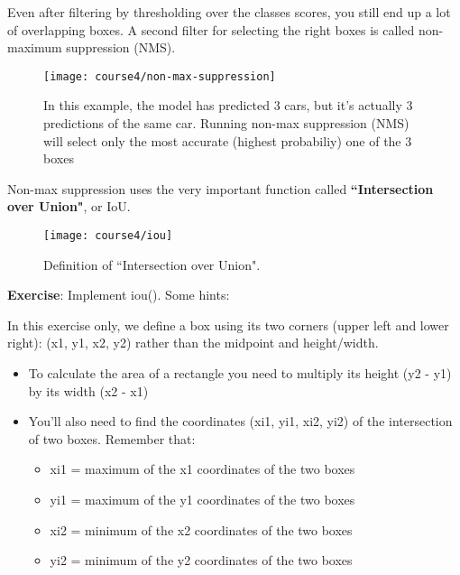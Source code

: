 Even after filtering by thresholding over the classes scores, you still end up a lot of overlapping boxes. A second filter for selecting the right boxes is called non-maximum suppression (NMS).
\begin{figure}[h]
\begin{center}
\texttt{[image: course4/non-max-suppression]}
\caption{In this example, the model has predicted 3 cars, but it's actually 3 predictions of the same car. Running non-max suppression (NMS) will select only the most accurate (highest probabiliy) one of the 3 boxes}
\end{center}
\end{figure}

Non-max suppression uses the very important function called {\textbf {``Intersection over Union"}}, or IoU.
\begin{figure}[h]
\begin{center}
\texttt{[image: course4/iou]}
\caption{Definition of ``Intersection over Union". }
\end{center}
\end{figure}




{\textbf {Exercise}}: Implement iou(). Some hints:

In this exercise only, we define a box using its two corners (upper left and lower right): (x1, y1, x2, y2) rather than the midpoint and height/width.
\begin{itemize}
\item To calculate the area of a rectangle you need to multiply its height (y2 - y1) by its width (x2 - x1)
\item You'll also need to find the coordinates (xi1, yi1, xi2, yi2) of the intersection of two boxes. Remember that:
\begin{itemize}
\item xi1 = maximum of the x1 coordinates of the two boxes
\item yi1 = maximum of the y1 coordinates of the two boxes
\item xi2 = minimum of the x2 coordinates of the two boxes
\item yi2 = minimum of the y2 coordinates of the two boxes
\end{itemize}
\end{itemize}

